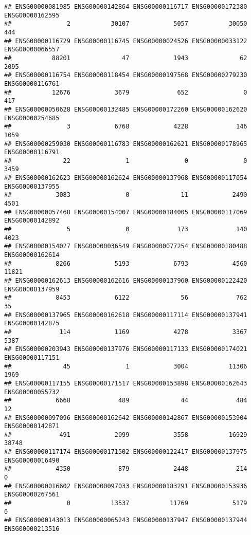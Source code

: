 \documentclass[
]{article}
\begin{document}
\begin{verbatim}
## ENSG00000081985 ENSG00000142864 ENSG00000116717 ENSG00000172380 ENSG00000162595 
##               2           30107            5057           30050             444 
## ENSG00000116729 ENSG00000116745 ENSG00000024526 ENSG00000033122 ENSG00000066557 
##           88201              47            1943              62            2095 
## ENSG00000116754 ENSG00000118454 ENSG00000197568 ENSG00000279230 ENSG00000116761 
##           12676            3679             652               0             417 
## ENSG00000050628 ENSG00000132485 ENSG00000172260 ENSG00000162620 ENSG00000254685 
##               3            6768            4228             146            1059 
## ENSG00000259030 ENSG00000116783 ENSG00000162621 ENSG00000178965 ENSG00000116791 
##              22               1               0               0            3459 
## ENSG00000162623 ENSG00000162624 ENSG00000137968 ENSG00000117054 ENSG00000137955 
##            3083               0              11            2490            4501 
## ENSG00000057468 ENSG00000154007 ENSG00000184005 ENSG00000117069 ENSG00000142892 
##               5               0             173             140            4023 
## ENSG00000154027 ENSG00000036549 ENSG00000077254 ENSG00000180488 ENSG00000162614 
##            8266            5193            6793            4560           11821 
## ENSG00000162613 ENSG00000162616 ENSG00000137960 ENSG00000122420 ENSG00000137959 
##            8453            6122              56             762              35 
## ENSG00000137965 ENSG00000162618 ENSG00000117114 ENSG00000137941 ENSG00000142875 
##             114            1169            4278            3367            5387 
## ENSG00000203943 ENSG00000137976 ENSG00000117133 ENSG00000174021 ENSG00000117151 
##              45               1            3004           11306            1969 
## ENSG00000117155 ENSG00000171517 ENSG00000153898 ENSG00000162643 ENSG00000055732 
##            6668             489              44             484              12 
## ENSG00000097096 ENSG00000162642 ENSG00000142867 ENSG00000153904 ENSG00000142871 
##             491            2099            3558           16929           38748 
## ENSG00000117174 ENSG00000171502 ENSG00000122417 ENSG00000137975 ENSG00000016490 
##            4350             879            2448             214               0 
## ENSG00000016602 ENSG00000097033 ENSG00000183291 ENSG00000153936 ENSG00000267561 
##               0           13537           11769            5179               0 
## ENSG00000143013 ENSG00000065243 ENSG00000137947 ENSG00000137944 ENSG00000213516 

\end{verbatim}
\end{document}
